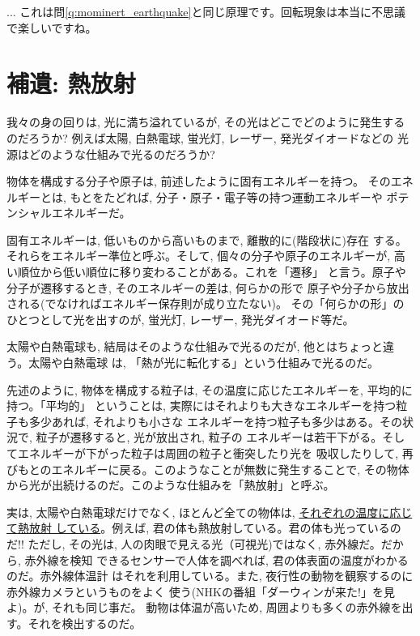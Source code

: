 \begin{faq}{\small{} ... 
これは問\ref{q:mominert_earthquake}と同じ原理です。回転現象は本当に不思議で楽しいですね。}\end{faq}
\hv




\section{補遺: 熱放射}\label{sect:thermalemission}

我々の身の回りは, 光に満ち溢れているが, その光はどこでどのように発生する
のだろうか? 例えば太陽, 白熱電球, 蛍光灯, レーザー, 発光ダイオードなどの
光源はどのような仕組みで光るのだろうか?

物体を構成する分子や原子は, 前述したように固有エネルギーを持つ。
そのエネルギーとは, もとをたどれば, 分子・原子・電子等の持つ運動エネルギーや
ポテンシャルエネルギーだ。

固有エネルギーは, 低いものから高いものまで, 離散的に(階段状に)存在
する。それらをエネルギー準位と呼ぶ。そして, 個々の分子や原子のエネルギーが, 
高い順位から低い順位に移り変わることがある。これを「遷移」
と言う。原子や分子が遷移するとき, そのエネルギーの差は, 何らかの形で
原子や分子から放出される(でなければエネルギー保存則が成り立たない)。
その「何らかの形」のひとつとして光を出すのが, 蛍光灯, レーザー, 
発光ダイオード等だ。

太陽や白熱電球も, 結局はそのような仕組みで光るのだが, 他とはちょっと違う。太陽や白熱電球
は, 「熱が光に転化する」という仕組みで光るのだ。

先述のように, 物体を構成する粒子は, その温度に応じたエネルギーを, 平均的に持つ。「平均的」
ということは, 実際にはそれよりも大きなエネルギーを持つ粒子も多少あれば, それよりも小さな
エネルギーを持つ粒子も多少はある。その状況で, 粒子が遷移すると, 光が放出され, 粒子の
エネルギーは若干下がる。そしてエネルギーが下がった粒子は周囲の粒子と衝突したり光を
吸収したりして, 再びもとのエネルギーに戻る。このようなことが無数に発生することで, 
その物体から光が出続けるのだ。このような仕組みを「熱放射」と呼ぶ。

実は, 太陽や白熱電球だけでなく, ほとんど全ての物体は, \underline{それぞれの温度に応じて熱放射
している}。例えば, 君の体も熱放射している。君の体も光っているのだ!! ただし, 
その光は, 人の肉眼で見える光（可視光)ではなく, 赤外線だ。だから, 赤外線を検知
できるセンサーで人体を調べれば, 君の体表面の温度がわかるのだ。赤外線体温計
はそれを利用している。また, 夜行性の動物を観察するのに赤外線カメラというものをよく
使う(NHKの番組「ダーウィンが来た!」を見よ)。が, それも同じ事だ。
動物は体温が高いため, 周囲よりも多くの赤外線を出す。それを検出するのだ。

